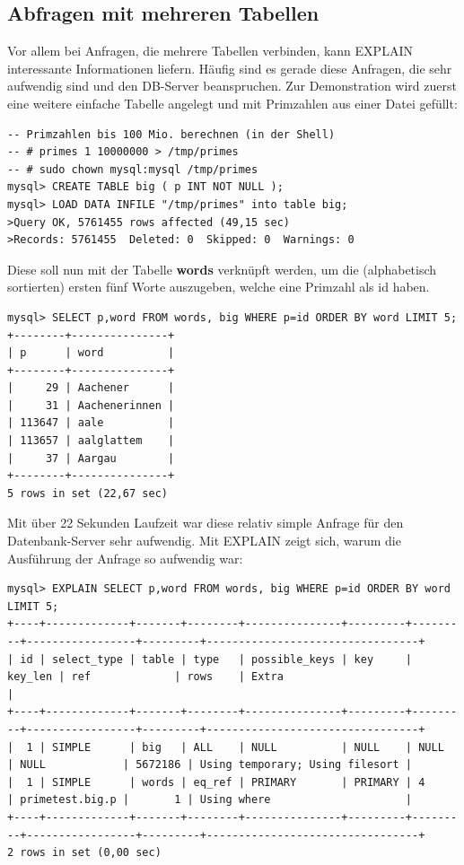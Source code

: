 \subsection{Abfragen mit mehreren Tabellen}
Vor allem bei Anfragen, die mehrere Tabellen verbinden, kann EXPLAIN interessante Informationen liefern. Häufig sind es gerade diese Anfragen, die sehr aufwendig sind und den DB-Server beanspruchen.
Zur Demonstration wird zuerst eine weitere einfache Tabelle angelegt und mit Primzahlen aus einer Datei gefüllt:
\begin{lstlisting}
-- Primzahlen bis 100 Mio. berechnen (in der Shell)
-- # primes 1 10000000 > /tmp/primes
-- # sudo chown mysql:mysql /tmp/primes
mysql> CREATE TABLE big ( p INT NOT NULL );
mysql> LOAD DATA INFILE "/tmp/primes" into table big;
>Query OK, 5761455 rows affected (49,15 sec)
>Records: 5761455  Deleted: 0  Skipped: 0  Warnings: 0
\end{lstlisting}
Diese soll nun mit der Tabelle \textbf{words} verknüpft werden, um die (alphabetisch sortierten) ersten fünf Worte auszugeben, welche eine Primzahl als id haben.
\begin{lstlisting}
mysql> SELECT p,word FROM words, big WHERE p=id ORDER BY word LIMIT 5;
+--------+---------------+
| p      | word          |
+--------+---------------+
|     29 | Aachener      |
|     31 | Aachenerinnen |
| 113647 | aale          |
| 113657 | aalglattem    |
|     37 | Aargau        |
+--------+---------------+
5 rows in set (22,67 sec)
\end{lstlisting}
Mit über 22 Sekunden Laufzeit war diese relativ simple Anfrage für den Datenbank-Server sehr aufwendig.
Mit EXPLAIN zeigt sich, warum die Ausführung der Anfrage so aufwendig war:
\begin{lstlisting}[basicstyle=\ttfamily\tiny]
mysql> EXPLAIN SELECT p,word FROM words, big WHERE p=id ORDER BY word LIMIT 5;
+----+-------------+-------+--------+---------------+---------+---------+-----------------+---------+---------------------------------+
| id | select_type | table | type   | possible_keys | key     | key_len | ref             | rows    | Extra                           |
+----+-------------+-------+--------+---------------+---------+---------+-----------------+---------+---------------------------------+
|  1 | SIMPLE      | big   | ALL    | NULL          | NULL    | NULL    | NULL            | 5672186 | Using temporary; Using filesort |
|  1 | SIMPLE      | words | eq_ref | PRIMARY       | PRIMARY | 4       | primetest.big.p |       1 | Using where                     |
+----+-------------+-------+--------+---------------+---------+---------+-----------------+---------+---------------------------------+
2 rows in set (0,00 sec)
\end{lstlisting}

